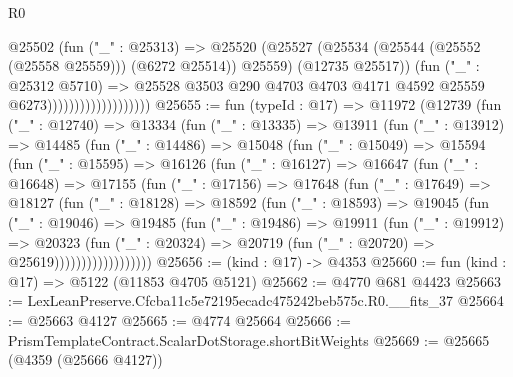 \begin{lexlean}{R0}
\begin{coremodule}
                                      @25502
                                        (fun ("_" : @25313) =>
                                        @25520
                                          (@25527
                                            (@25534
                                              (@25544 (@25552 (@25558 @25559)))
                                              (@6272 @25514))
                                            @25559)
                                          (@12735 @25517))
                                        (fun ("_" : @25312 @5710) =>
                                        @25528
                                          @3503
                                          @290
                                          @4703
                                          @4703
                                          @4171
                                          @4592
                                          @25559
                                          @6273)))))))))))))))))))
@25655 := fun (typeId : @17) =>
  @11972
    (@12739
      (fun ("_" : @12740) =>
      @13334
        (fun ("_" : @13335) =>
        @13911
          (fun ("_" : @13912) =>
          @14485
            (fun ("_" : @14486) =>
            @15048
              (fun ("_" : @15049) =>
              @15594
                (fun ("_" : @15595) =>
                @16126
                  (fun ("_" : @16127) =>
                  @16647
                    (fun ("_" : @16648) =>
                    @17155
                      (fun ("_" : @17156) =>
                      @17648
                        (fun ("_" : @17649) =>
                        @18127
                          (fun ("_" : @18128) =>
                          @18592
                            (fun ("_" : @18593) =>
                            @19045
                              (fun ("_" : @19046) =>
                              @19485
                                (fun ("_" : @19486) =>
                                @19911
                                  (fun ("_" : @19912) =>
                                  @20323
                                    (fun ("_" : @20324) =>
                                    @20719 (fun ("_" : @20720) => @25619))))))))))))))))))
@25656 := (kind : @17) -> @4353
@25660 := fun (kind : @17) => @5122 (@11853 @4705 @5121)
@25662 := @4770 @681 @4423
@25663 := LexLeanPreserve.Cfcba11c5e72195ecadc475242beb575c.R0.__fits_37
@25664 := @25663 @4127
@25665 := @4774 @25664
@25666 := PrismTemplateContract.ScalarDotStorage.shortBitWeights
@25669 := @25665 (@4359 (@25666 @4127))

\end{coremodule}
\end{lexlean}
